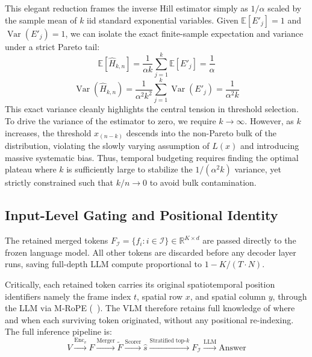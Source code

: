 \documentclass[12pt]{article}
\begin{document}
%
This elegant reduction frames the inverse Hill estimator simply as $1/\alpha$ scaled by the sample mean of $k$ iid standard exponential variables. Given $\mathbb{E}[E'_j] = 1$ and $\operatorname{Var}(E'_j) = 1$, we can isolate the exact finite-sample expectation and variance under a strict Pareto tail:
%
\begin{equation}
    \mathbb{E}[\hat{H}_{k,n}] = \frac{1}{\alpha k} \sum_{j=1}^{k} \mathbb{E}[E'_j] = \frac{1}{\alpha}
\end{equation}
%
\begin{equation}
    \operatorname{Var}(\hat{H}_{k,n}) = \frac{1}{\alpha^2 k^2} \sum_{j=1}^{k} \operatorname{Var}(E'_j) = \frac{1}{\alpha^2 k}
\end{equation}
%
This exact variance cleanly highlights the central tension in threshold selection. To drive the variance of the estimator to zero, we require $k \to \infty$. However, as $k$ increases, the threshold $x_{(n-k)}$ descends into the non-Pareto bulk of the distribution, violating the slowly varying assumption of $L(x)$ and introducing massive systematic bias. Thus, temporal budgeting requires finding the optimal plateau where $k$ is sufficiently large to stabilize the $1/(\alpha^2 k)$ variance, yet strictly constrained such that $k/n \to 0$ to avoid bulk contamination.
 
\subsection{Input-Level Gating and Positional Identity}
 
The retained merged tokens $F_{\mathcal{I}} = \{f_i : i \in \mathcal{I}
\} \in \mathbb{R}^{K \times d}$ are passed directly to the frozen
language model. All other tokens are discarded before any decoder layer
runs, saving full-depth LLM compute proportional to $1 - K /
(T \cdot N)$.
 
Critically, each retained token carries its original spatiotemporal
position identifiers namely the frame index $t$, spatial row $x$, and spatial
column $y$, through the LLM via
M-RoPE (~\cite{bai2025qwen25vltechnicalreport}). The VLM therefore retains full
knowledge of where and when each surviving token originated, without
any positional re-indexing. The full inference pipeline is:
%
\begin{equation}
    V
    \xrightarrow{\text{Enc}_v} F
    \xrightarrow{\text{Merger}} \tilde{F}
    \xrightarrow{\text{Scorer}} \hat{s}
    \xrightarrow{\text{Stratified top-}k} F_{\mathcal{I}}
    \xrightarrow{\text{LLM}} \text{Answer}
\end{equation}
\end{document}
